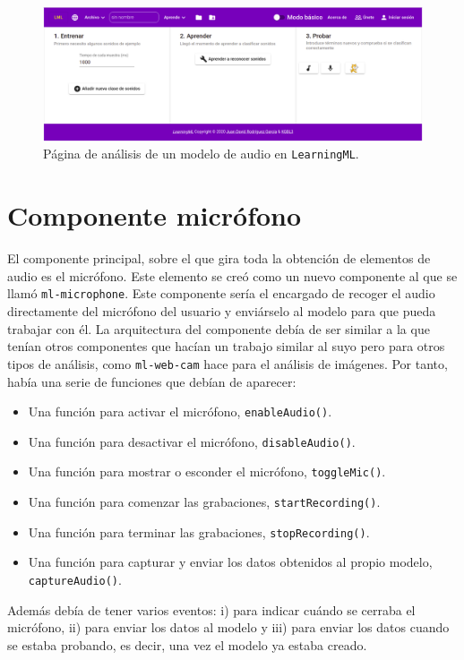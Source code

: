 \documentclass[a4paper, 12pt]{book}
\begin{document}
\begin{figure}
	\centering
	\includegraphics[width=15cm, keepaspectratio]{img/audio-model.png}
	\caption{Página de análisis de un modelo de audio en \texttt{LearningML}.}\label{fig:audio-page}
\end{figure}

\section{Componente micrófono}
\label{sec:mic}

El componente principal, sobre el que gira toda la obtención de elementos de audio es el micrófono. Este elemento se creó como un nuevo componente al que se llamó \texttt{ml-microphone}. Este componente sería el encargado de recoger el audio directamente del micrófono del usuario y enviárselo al modelo para que pueda trabajar con él. La arquitectura del componente debía de ser similar a la que tenían otros componentes que hacían un trabajo similar al suyo pero para otros tipos de análisis, como \texttt{ml-web-cam} hace para el análisis de imágenes. Por tanto, había una serie de funciones que debían de aparecer:
\begin{itemize}
	\item Una función para activar el micrófono, \texttt{enableAudio()}.
	\item Una función para desactivar el micrófono, \texttt{disableAudio()}.
	\item Una función para mostrar o esconder el micrófono, \texttt{toggleMic()}.
	\item Una función para comenzar las grabaciones, \texttt{startRecording()}.
	\item Una función para terminar las grabaciones, \texttt{stopRecording()}.
	\item Una función para capturar y enviar los datos obtenidos al propio modelo, \texttt{captureAudio()}.
\end{itemize}

Además debía de tener varios eventos: i) para indicar cuándo se cerraba el micrófono, ii) para enviar los datos al modelo y iii) para enviar los datos cuando se estaba probando, es decir, una vez el modelo ya estaba creado.
\end{document}
